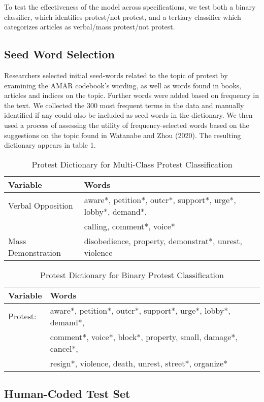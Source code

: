 \documentclass[
]{article}
\begin{document}
To test the effectiveness of the model across specifications, we test
both a binary classifier, which identifies protest/not protest, and a
tertiary classifier which categorizes articles as verbal/mass
protest/not protest.

\hypertarget{seed-word-selection}{%
\subsection{Seed Word Selection}\label{seed-word-selection}}

Researchers selected initial seed-words related to the topic of protest
by examining the AMAR codebook's wording, as well as words found in
books, articles and indices on the topic. Further words were added based
on frequency in the text. We collected the 300 most frequent terms in
the data and manually identified if any could also be included as seed
words in the dictionary. We then used a process of assessing the utility
of frequency-selected words based on the suggestions on the topic found
in Watanabe and Zhou (2020). The resulting dictionary appears in table
1.

\begin{table}[!htb]
\centering
\caption{Protest Dictionary for Multi-Class Protest Classification}
\begin{tabular}{l|l}
\hline
\textbf{Variable} & \textbf{Words} \\ \hline
Verbal Opposition & aware*, petition*, outcr*, support*, urge*, lobby*, demand*, \\
 & calling, comment*, voice* \\
Mass Demonstration & disobedience, property, demonstrat*, unrest, violence
\end{tabular}
\end{table}

\begin{table}[!htb]
\centering
\caption{Protest Dictionary for Binary Protest Classification}
\begin{tabular}{l|l}
\hline
\textbf{Variable} & \textbf{Words} \\ \hline
Protest: & aware*, petition*, outcr*, support*, urge*, lobby*, demand*, \\
 & comment*, voice*, block*, property, small, damage*, cancel*, \\
 & resign*, violence, death, unrest, street*, organize*
\end{tabular}
\end{table}

\hypertarget{human-coded-test-set}{%
\subsection{Human-Coded Test Set}\label{human-coded-test-set}}
\end{document}
